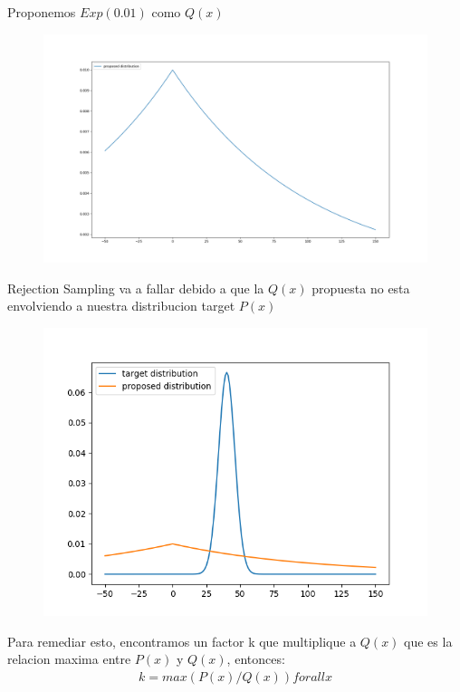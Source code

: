 \documentclass[11pt,a4paper]{article}
\begin{document}
	Proponemos $Exp(0.01)$ como $Q(x)$
	\begin{figure}[H]
  			\centering
    			\includegraphics[width=14cm]{imagenes/proposed}
	\end{figure}
	Rejection Sampling va a fallar debido a que la $Q(x)$ propuesta no esta envolviendo a nuestra distribucion target $P(x)$
	\begin{figure}[H]
  			\centering
    			\includegraphics[width=14cm]{imagenes/proposed_not_escaled}
	\end{figure}
	Para remediar esto, encontramos un factor k que multiplique a $Q(x)$ que es la relacion maxima entre $P(x)$ y $Q(x)$, entonces:
	\begin{align*}
		k = max(P(x) / Q(x)) for all x
	\end{align*}
\end{document}
